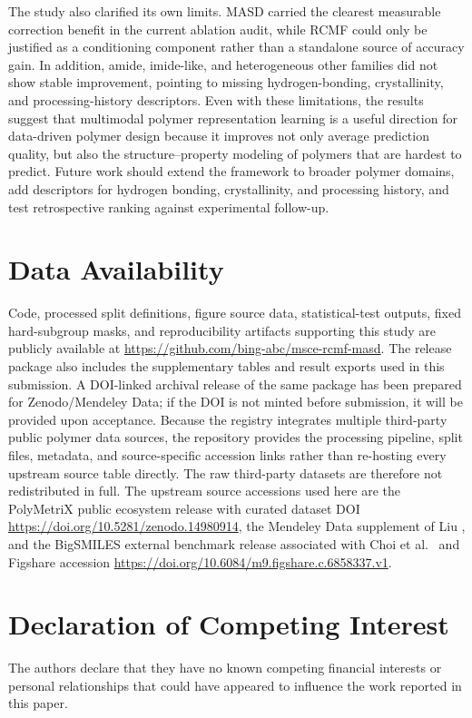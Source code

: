 \documentclass[review,12pt]{elsarticle}
\begin{document}
The study also clarified its own limits. MASD carried the clearest measurable correction benefit in the current ablation audit, while RCMF could only be justified as a conditioning component rather than a standalone source of accuracy gain. In addition, amide, imide-like, and heterogeneous other families did not show stable improvement, pointing to missing hydrogen-bonding, crystallinity, and processing-history descriptors. Even with these limitations, the results suggest that multimodal polymer representation learning is a useful direction for data-driven polymer design because it improves not only average prediction quality, but also the structure--property modeling of polymers that are hardest to predict. Future work should extend the framework to broader polymer domains, add descriptors for hydrogen bonding, crystallinity, and processing history, and test retrospective ranking against experimental follow-up.

\section*{Data Availability}
Code, processed split definitions, figure source data, statistical-test outputs, fixed hard-subgroup masks, and reproducibility artifacts supporting this study are publicly available at \url{https://github.com/bing-abc/msce-rcmf-masd}. The release package also includes the supplementary tables and result exports used in this submission. A DOI-linked archival release of the same package has been prepared for Zenodo/Mendeley Data; if the DOI is not minted before submission, it will be provided upon acceptance. Because the registry integrates multiple third-party public polymer data sources, the repository provides the processing pipeline, split files, metadata, and source-specific accession links rather than re-hosting every upstream source table directly. The raw third-party datasets are therefore not redistributed in full. The upstream source accessions used here are the PolyMetriX public ecosystem release \cite{kunchapu2025polymetrix} with curated dataset DOI \url{https://doi.org/10.5281/zenodo.14980914}, the Mendeley Data supplement of Liu \cite{liu2023mendeleytg}, and the BigSMILES external benchmark release associated with Choi et al.\ \cite{choi2024bigsmilesdata} and Figshare accession \url{https://doi.org/10.6084/m9.figshare.c.6858337.v1}.

\section*{Declaration of Competing Interest}
The authors declare that they have no known competing financial interests or personal relationships that could have appeared to influence the work reported in this paper.
\end{document}
